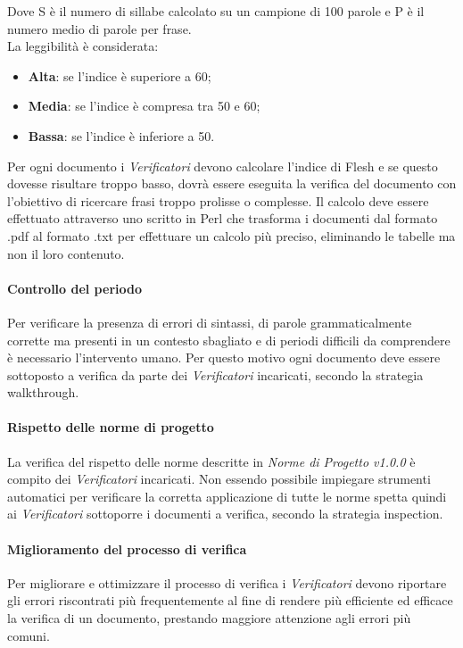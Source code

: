 Dove S è il numero di sillabe calcolato su un campione di 100 parole e P è il numero medio di parole per frase.\\
La leggibilità è considerata:
\begin{itemize}
	\item{\textbf{Alta}}: se l'indice è superiore a 60;
	\item{\textbf{Media}}: se l'indice è compresa tra 50 e 60;
	\item{\textbf{Bassa}}: se l'indice è inferiore a 50.
\end{itemize}
Per ogni documento i \emph{Verificatori} devono calcolare l'indice di Flesh e se questo dovesse risultare troppo basso, dovrà essere eseguita la verifica del documento con l'obiettivo di ricercare frasi troppo prolisse o complesse. Il calcolo deve essere effettuato attraverso uno  scritto in Perl che trasforma i documenti dal formato .pdf al formato .txt per effettuare un calcolo più preciso, eliminando le tabelle ma non il loro contenuto.
\paragraph{Controllo del periodo} \Spazio
Per verificare la presenza di errori di sintassi, di parole grammaticalmente corrette ma presenti in un contesto sbagliato e di periodi difficili da comprendere è necessario l'intervento umano. Per questo motivo ogni documento deve essere sottoposto a verifica da parte dei \emph{Verificatori} incaricati, secondo la strategia walkthrough.

\paragraph{Rispetto delle norme di progetto} \Spazio
La verifica del rispetto delle norme descritte in \emph{Norme di Progetto v1.0.0} è compito dei \emph{Verificatori} incaricati. Non essendo possibile impiegare strumenti automatici per verificare la corretta applicazione di tutte le norme spetta quindi ai \emph{Verificatori} sottoporre i documenti a verifica, secondo la strategia inspection.

\paragraph{Miglioramento del processo di verifica} \Spazio
Per migliorare e ottimizzare il processo di verifica i \emph{Verificatori} devono riportare gli errori riscontrati più frequentemente al fine di rendere più efficiente ed efficace la verifica di un documento, prestando maggiore attenzione agli errori più comuni.



\pagebreak
